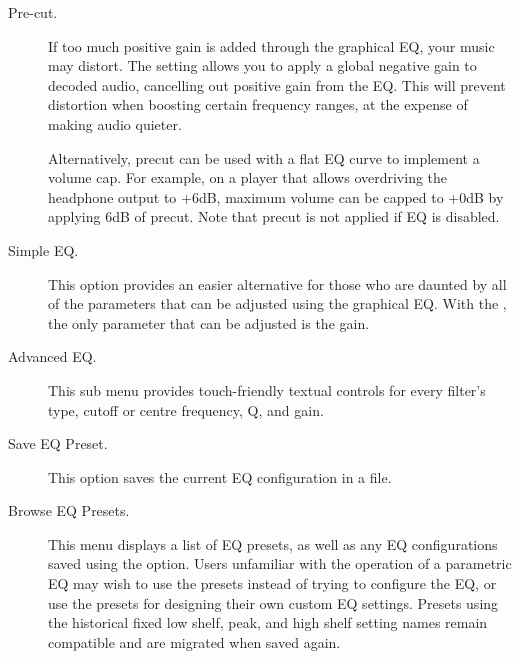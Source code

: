 \begin {description}
  \item[Pre-cut.]
  If too much positive gain is added through the graphical EQ, your music may
  distort.  The  setting allows you to apply a global negative
  gain to decoded audio, cancelling out positive gain from the EQ.  This will
  prevent distortion when boosting certain frequency ranges, at the expense of
  making audio quieter.

  Alternatively, precut can be used with a flat EQ curve to implement a volume
  cap.  For example, on a player that allows overdriving the headphone output
  to +6dB, maximum volume can be capped to +0dB by applying 6dB of precut. Note
  that precut is not applied if EQ is disabled.

\item[Simple EQ.]
This option provides an easier alternative for those who are daunted by all of
the parameters that can be adjusted using the graphical EQ. With the
, the only parameter that can be adjusted is the gain.

\item[Advanced EQ.]
This sub menu provides touch-friendly textual controls for every filter's
type, cutoff or centre frequency, Q, and gain.

\item[Save EQ Preset.]
This option saves the current EQ configuration in a  file.

\item[Browse EQ Presets.]
This menu displays a list of EQ presets, as well as any EQ configurations saved
using the  option. Users unfamiliar with the
operation of a parametric EQ may wish to use the presets instead of trying to
configure the EQ, or use the presets for designing their own custom EQ
settings. Presets using the historical fixed low shelf, peak, and high shelf
setting names remain compatible and are migrated when saved again.

\end{description}

